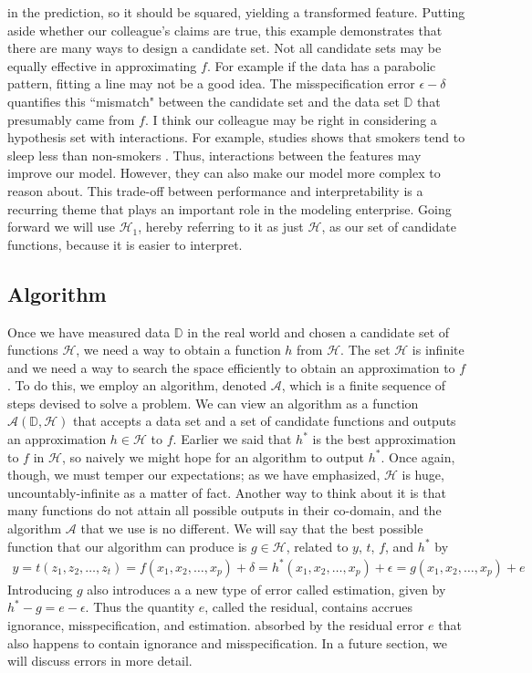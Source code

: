 \documentclass[12pt]{article}
\begin{document}
	in the prediction, so it should be squared, yielding a transformed feature.
	Putting aside whether our colleague's claims are true,
	this example demonstrates that there are many ways to design a candidate set. Not
	all candidate sets may be equally effective in approximating $f$. For example if the
	data has a parabolic pattern, fitting a line may not be a good idea. The misspecification
	error $\epsilon-\delta$ quantifies this ``mismatch" between the candidate set
	and the data set $\mathbb{D}$ that presumably came from $f$. I think our
	colleague may be right in considering a hypothesis set with interactions.
	For example, studies shows that smokers tend to sleep less than non-smokers
	\cite{SciDirect-smoking-sleeping}. Thus, interactions between the features
	may improve our model. However, they can also make our model more complex to
	reason about. This trade-off between performance and interpretability
	is a recurring theme that plays an important role in the modeling enterprise.
	Going forward we will use $\mathcal{H}_1$, hereby referring to it as just
	$\mathcal{H}$, as our set of candidate functions, because it is easier
	to interpret.
	\subsection{Algorithm}
	Once we have measured data $\mathbb{D}$ in the real world and chosen
	a candidate set of functions $\mathcal{H}$, we need a way to obtain
	a function $h$ from $\mathcal{H}$. The set $\mathcal{H}$ is infinite
	and we need a way to search the space efficiently to obtain an approximation
	to $f$. To do this, we employ an algorithm, denoted $\mathcal{A}$, which
	is a finite sequence of steps devised to solve a problem. We can view
	an algorithm as a function $\mathcal{A}(\mathbb{D}, \mathcal{H})$
	that accepts a data set and a set of candidate functions and outputs
	an approximation $h\in\mathcal{H}$ to $f$. Earlier we said that $h^*$ is the
	best approximation to $f$ in $\mathcal{H}$, so naively we might hope for
	an algorithm to output $h^*$. Once again, though, we must temper our expectations;
	as we have emphasized, $\mathcal{H}$ is huge, uncountably-infinite as
	a matter of fact. Another way to think about it is that many functions
	do not attain all possible outputs in their co-domain, and the algorithm
	$\mathcal{A}$ that we use is no different. We will say that the best
	possible function that our algorithm can produce is $g\in\mathcal{H}$,
	related to $y$, $t$, $f$, and $h^*$ by
	\begin{align*}
		y
		= t(z_1,z_2,\ldots,z_t)
		= f(x_1,x_2,\ldots,x_p) + \delta
		= h^*(x_1,x_2,\ldots,x_p) + \epsilon
		= g(x_1,x_2,\ldots,x_p) + e
	\end{align*}
	Introducing $g$ also introduces a a new type of error called estimation,
	given by $h^* - g = e - \epsilon$. Thus the quantity $e$, called the residual,
	contains accrues ignorance, misspecification, and estimation.
	absorbed by the residual error $e$ that also happens to contain ignorance
	and misspecification. In a future section, we will discuss errors in more detail.
	
\end{document}
